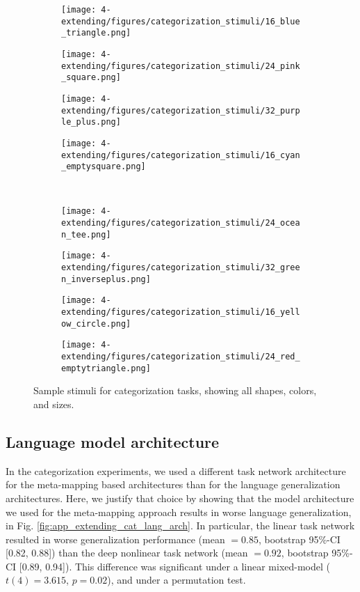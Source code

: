 \begin{figure}[!htb]
\centering
\begin{subfigure}{0.24\textwidth}
\texttt{[image: 4-extending/figures/categorization\_stimuli/16\_blue\_triangle.png]}
\end{subfigure}%
\begin{subfigure}{0.24\textwidth}
\texttt{[image: 4-extending/figures/categorization\_stimuli/24\_pink\_square.png]}
\end{subfigure}%
\begin{subfigure}{0.24\textwidth}
\texttt{[image: 4-extending/figures/categorization\_stimuli/32\_purple\_plus.png]}
\end{subfigure}%
\begin{subfigure}{0.24\textwidth}
\texttt{[image: 4-extending/figures/categorization\_stimuli/16\_cyan\_emptysquare.png]}
\end{subfigure}\\
\begin{subfigure}{0.24\textwidth}
\texttt{[image: 4-extending/figures/categorization\_stimuli/24\_ocean\_tee.png]}
\end{subfigure}%
\begin{subfigure}{0.24\textwidth}
\texttt{[image: 4-extending/figures/categorization\_stimuli/32\_green\_inverseplus.png]}
\end{subfigure}%
\begin{subfigure}{0.24\textwidth}
\texttt{[image: 4-extending/figures/categorization\_stimuli/16\_yellow\_circle.png]}
\end{subfigure}%
\begin{subfigure}{0.24\textwidth}
\texttt{[image: 4-extending/figures/categorization\_stimuli/24\_red\_emptytriangle.png]}
\end{subfigure}%
\caption{Sample stimuli for categorization tasks, showing all shapes, colors, and sizes.} \label{fig:app_extending_cat_stims}
\end{figure}

\subsection{Language model architecture} \label{app:extending_categorization_lang_arch}

In the categorization experiments, we used a different task network architecture for the meta-mapping based architectures than for the language generalization architectures. Here, we justify that choice by showing that the model architecture we used for the meta-mapping approach results in worse language generalization, in Fig. \ref{fig:app_extending_cat_lang_arch}. In particular, the linear task network resulted in worse generalization performance (mean \(= 0.85\), bootstrap 95\%-CI [0.82, 0.88]) than the deep nonlinear task network (mean \(= 0.92\), bootstrap 95\%-CI [0.89, 0.94]). This difference was significant under a linear mixed-model (\(t(4) = 3.615\), \(p = 0.02\)), and under a permutation test. \par 

